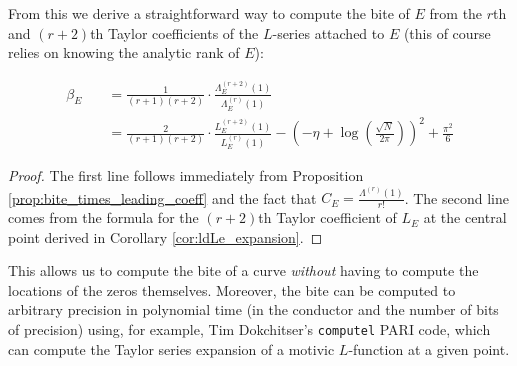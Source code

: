 \documentclass[10pt]{article}
\begin{document}
From this we derive a straightforward way to compute the bite of $E$ from the $r$th and $(r+2)$th Taylor coefficients of the $L$-series attached to $E$ (this of course relies on knowing the analytic rank of $E$):
\begin{corollary}
\begin{align}
\beta_E \quad &= \frac{1}{(r+1)(r+2)} \cdot \frac{\Lambda_E^{(r+2)}(1)}{\Lambda_E^{(r)}(1)} \\
&= \frac{2}{(r+1)(r+2)} \cdot \frac{L_E^{(r+2)}(1)}{L_E^{(r)}(1)} - \left(-\eta+\log\left(\frac{\sqrt{N}}{2\pi}\right)\right)^2 + \frac{\pi^2}{6}
\end{align}
\end{corollary}
\begin{proof}
The first line follows immediately from Proposition \ref{prop:bite_times_leading_coeff} and the fact that $C_E = \frac{\Lambda^{(r)}(1)}{r!}$. The second line comes from the formula for the $(r+2)$th Taylor coefficient of $L_E$ at the central point derived in Corollary \ref{cor:ldLe_expansion}.
\end{proof}
This allows us to compute the bite of a curve {\it without} having to compute the locations of the zeros themselves. Moreover, the bite can be computed to arbitrary precision in polynomial time (in the conductor and the number of bits of precision) using, for example, Tim Dokchitser's {\tt computel} PARI code, which can compute the Taylor series expansion of a motivic $L$-function at a given point. \\

\end{document}
